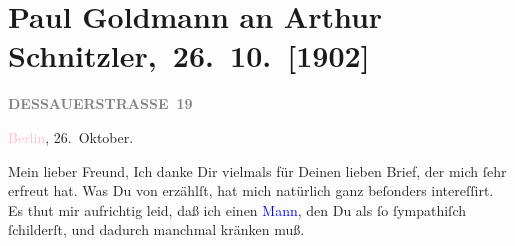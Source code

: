

\renewcommand{\erwaehntePersonen}{Personen: Gerhart Hauptmann, Maurice Maeterlinck, Heinrich Schnitzler, Olga Schnitzler, Agnes Sorma}
\renewcommand{\erwaehnteInstitutionen}{Institutionen: Berliner Theater, Buchhandlung L. Rosner, Deutsches Theater Berlin}
\renewcommand{\erwaehnteOrte}{Orte: Agnetendorf, Berlin, Dessauer Straße, Deutsches Theater Berlin, Grunewald, Haus Wiesenstein, Wien}
\renewcommand{\erwaehnteWerke}{Werke: Der Schleier der Beatrice. Schauspiel in fünf Akten, Die »neue Richtung«. Polemische Aufsätze über Berliner Theater-Aufführungen, Monna Vanna. Schauspiel in drei Akten}
\section[ Paul Goldmann an Arthur Schnitzler, 26. 10. {[}1902{]}]{Paul Goldmann an Arthur Schnitzler, 26. 10. {[}1902{]}}
\nopagebreak{}
\rehead{ }\normalsize\beginnumbering{}
\toendnotes[C]{\smallbreak\pagebreak[2]}
\toendnotes[C]{\smallbreak}
\pstart
           \noindent{}\raggedleft{}{\pb}\textcolor{pink}{\textcolor{gray}{\textbf{DESSAUERSTRASSE 19}}}{}\ledrightnote{\textcolor{pink}{Dessauer Straße}}\pend
           
\pstart
           \textcolor{pink}{Berlin}{}\ledrightnote{\textcolor{pink}{Berlin}}, 26. Oktober.\pend
           
\pstart\center{}Mein lieber Freund,\pend
\pstart
           Ich danke Dir vielmals für Deinen lieben Brief, der mich ſehr erfreut hat. Was Du von
                  \label{K_L03228-1v}\label{K_L03228-1h} erzählſt, hat mich natürlich ganz beſonders intereſſirt. Es thut mir
               aufrichtig leid, daß ich einen \textcolor{blue}{Mann}{}\ledrightnote{{$\rightarrow$}\textcolor{blue}{Gerhart Hauptmann}}, den Du als ſo ſympathiſch ſchilderſt, \label{K_L03228-2v}\label{K_L03228-2h} und dadurch manchmal kränken muß.\pend
           
